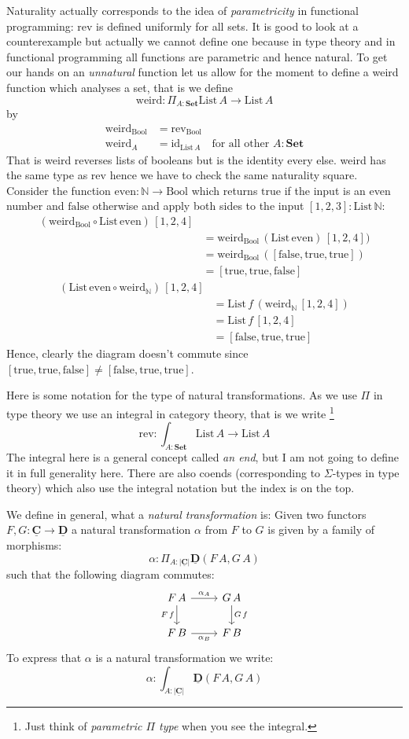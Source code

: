 \documentclass{article}
\newcommand{\Set}{\mathbf{Set}}
\newcommand{\Bool}{\mathrm{Bool}}
\newcommand{\true}{\mathrm{true}}
\newcommand{\false}{\mathrm{false}}
\newcommand{\cat}[1]{\underline{\mathbf{#1}}}
\newcommand{\obj}[1]{|#1|}
\newcommand{\id}{\mathrm{id}}
\newcommand{\Nat}{\mathbb{N}}
\newcommand{\List}{\mathrm{List}}
\newcommand{\rev}{\mathrm{rev}}
\newcommand{\weird}{\mathrm{weird}}
\newcommand{\even}{\mathrm{even}}
\begin{document}
Naturality actually corresponds to the idea of \emph{parametricity} in functional programming: $\rev$ is defined uniformly for all sets. It is good to look at a counterexample but actually we cannot define one because in type theory and in functional programming all functions are parametric and hence natural. To get our hands on an \emph{unnatural} function let us allow for the moment to define a weird function which analyses a set, that is we define
\[ \weird : \Pi_{A:\Set} \List\,A \to \List\,A\]
by 
\begin{align*}
  \weird_\Bool & = \rev_\Bool \\
  \weird_A & = \id_{\List\,A} \quad\mbox{for all other $A:\Set$}
\end{align*}
That is weird reverses lists of booleans but is the identity every else. weird has the same type as $\rev$ hence we have to check the same naturality square. Consider the function $\even : \Nat \to \Bool$ which returns $\true$ if the input is an even number and $\false$ otherwise and apply both sides to the input $[1,2,3]:\List\,\Nat$:
\begin{align*}
(\weird_\Bool \circ \List\,\even)\,[1,2,4] \\
& = \weird_\Bool\,(\List\,\even)\,[1,2,4])  \\
& = \weird_\Bool\,([\false,\true,\true])  \\
& = [\true,\true,\false]
\end{align*}
\begin{align*}
(\List\,\even\circ \weird_\Nat)\, [1,2,4] \\
& = \List\,f\,(\weird_\Nat\, [1,2,4]) \\
& = \List\,f\,[1,2,4] \\
& = [\false,\true,\true]
\end{align*}
Hence, clearly the diagram doesn't commute since $[\true,\true,\false] \not= [\false,\true,\true]$.

Here is some notation for the type of natural transformations. As we use $\Pi$ in type theory we use an integral in category theory, that is we write
\footnote{Just think of \emph{parametric $\Pi$ type} when you see the integral.}
\[ \rev : \int_{A:\Set} \List\,A \to \List\,A \]
The integral here is a general concept called \emph{an end}, but I am not going to define it in full generality here. There are also coends (corresponding to $\Sigma$-types in type theory) which also use the integral notation but the index is on the top.

We define in general, what a \emph{natural transformation} is: Given two functors $F,G : \cat{C} \to \cat{D}$ a natural transformation $\alpha$ from $F$ to $G$ is given by a family of morphisms: 
\[\alpha : \Pi_{A : \obj{\cat{C}}} \cat{D}(F\,A,G\,A)\]
such that the following diagram commutes:
\[\begin{tikzcd}
F\,A \arrow[r,"\alpha_A"] \arrow[d,"F\,f" left] & G\,A \arrow[d,"G\,f"]\\
F\,B \arrow[r,"\alpha_B" below] & F\,B
\end{tikzcd}
\]
To express that $\alpha$ is a natural transformation we write:
\[ \alpha : \int_{A : \obj{\cat{C}}} \cat{D}(F\,A,G\,A)\]
\end{document}
